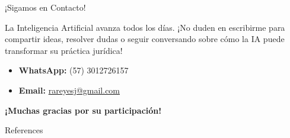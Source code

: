 \documentclass[aspectratio=169]{beamer}
\begin{document}
\begin{frame}{¡Sigamos en Contacto!}


La Inteligencia Artificial avanza todos los días. ¡No duden en escribirme para compartir ideas, resolver dudas o seguir conversando sobre cómo la IA puede transformar su práctica jurídica!

\begin{itemize}
  \item \textbf{WhatsApp:} (57) 3012726157
  \item \textbf{Email:} \href{mailto:rareyesj@gmail.com}{rareyesj@gmail.com}
\end{itemize}
\textbf{¡Muchas gracias por su participación!}
\end{frame}



\begin{frame}[allowframebreaks]{References}
  
  
\end{frame}
\end{document}
